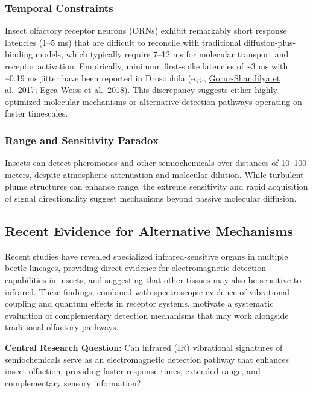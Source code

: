 \documentclass[
  13pt,
  a4paperpaper,
  12pt]{article}
\begin{document}
\subsubsection{Temporal Constraints}\label{temporal-constraints}

Insect olfactory receptor neurons (ORNs) exhibit remarkably short
response latencies (1--5 ms) that are difficult to reconcile with
traditional diffusion-plus-binding models, which typically require 7--12
ms for molecular transport and receptor activation. Empirically, minimum
first‑spike latencies of \textasciitilde3 ms with \textasciitilde0.19 ms
jitter have been reported in Drosophila (e.g.,
\href{https://elifesciences.org/articles/27670}{Gorur-Shandilya et
al.~2017};
\href{https://pmc.ncbi.nlm.nih.gov/articles/PMC6147046/}{Egea-Weiss et
al.~2018}). This discrepancy suggests either highly optimized molecular
mechanisms or alternative detection pathways operating on faster
timescales.

\subsubsection{Range and Sensitivity
Paradox}\label{range-and-sensitivity-paradox}

Insects can detect pheromones and other semiochemicals over distances of
10--100 meters, despite atmospheric attenuation and molecular dilution.
While turbulent plume structures can enhance range, the extreme
sensitivity and rapid acquisition of signal directionality suggest
mechanisms beyond passive molecular diffusion.

\subsection{Recent Evidence for Alternative
Mechanisms}\label{recent-evidence-for-alternative-mechanisms}

Recent studies have revealed specialized infrared-sensitive organs in
multiple beetle lineages, providing direct evidence for electromagnetic
detection capabilities in insects, and suggesting that other tissues may
also be sensitive to infrared. These findings, combined with
spectroscopic evidence of vibrational coupling and quantum effects in
receptor systems, motivate a systematic evaluation of complementary
detection mechanisms that may work alongside traditional olfactory
pathways.

\textbf{Central Research Question:} Can infrared (IR) vibrational
signatures of semiochemicals serve as an electromagnetic detection
pathway that enhances insect olfaction, providing faster response times,
extended range, and complementary sensory information?
\end{document}
